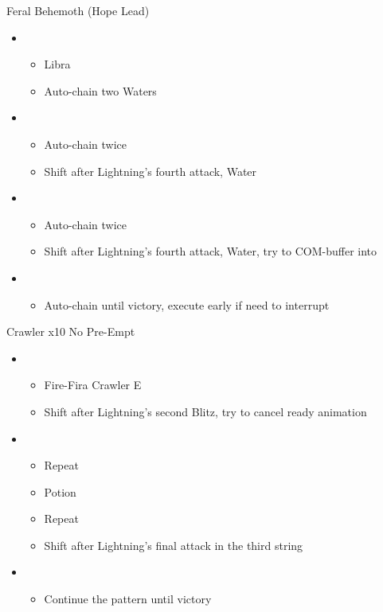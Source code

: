 \begin{battle}{Feral Behemoth (Hope Lead)}
\begin{itemize}
    \item \first
    \begin{itemize}
        \item Libra
        \item Auto-chain two Waters
    \end{itemize}
    \item \fourth
    \begin{itemize}
        \item Auto-chain twice
        \item Shift after Lightning's fourth attack, Water
    \end{itemize}
    \item \fifth
    \begin{itemize}
        \item Auto-chain twice
        \item Shift after Lightning's fourth attack, Water, try to COM-buffer into
    \end{itemize}
    \item \first
    \begin{itemize}
        \item Auto-chain until victory, execute early if need to interrupt
    \end{itemize}
\end{itemize}
\end{battle}

\begin{battle}{Crawler x10 No Pre-Empt}
\begin{itemize}
    \item \first
    \begin{itemize}
        \item Fire-Fira Crawler E
        \item Shift after Lightning's second Blitz, try to cancel ready animation
    \end{itemize}
    \item \sixth
    \begin{itemize}
        \item Repeat
        \item Potion
        \item Repeat
        \item Shift after Lightning's final attack in the third string
    \end{itemize}
    \item \first
    \begin{itemize}
        \item Continue the pattern until victory
    \end{itemize}
\end{itemize}
\end{battle}

